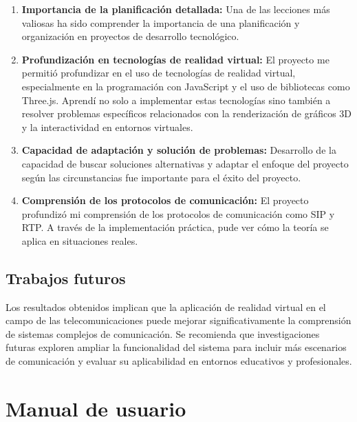 \documentclass[a4paper, 12pt]{book}
\begin{document}
\begin{enumerate}
\item \textbf{Importancia de la planificación detallada:} Una de las lecciones más valiosas ha sido comprender la importancia de una planificación 
y organización en proyectos de desarrollo tecnológico.

\item \textbf{Profundización en tecnologías de realidad virtual:} El proyecto me permitió profundizar en el uso de tecnologías de realidad virtual, 
especialmente en la programación con JavaScript y el uso de bibliotecas como Three.js. Aprendí no solo a implementar estas tecnologías sino también 
a resolver problemas específicos relacionados con la renderización de gráficos 3D y la interactividad en entornos virtuales.

\item \textbf{Capacidad de adaptación y solución de problemas:} Desarrollo de la capacidad de buscar soluciones alternativas y adaptar el enfoque del proyecto según las 
circunstancias fue importante para el éxito del proyecto.

\item \textbf{Comprensión de los protocolos de comunicación:} El proyecto profundizó mi comprensión de los protocolos de comunicación como SIP y RTP. 
A través de la implementación práctica, pude ver cómo la teoría se aplica en situaciones reales.
\end{enumerate}


\section{Trabajos futuros}
\label{sec:trabajos_futuros}

Los resultados obtenidos implican que la aplicación de realidad virtual en el campo de las telecomunicaciones puede mejorar 
significativamente la comprensión de sistemas complejos de comunicación. Se recomienda que investigaciones futuras exploren 
ampliar la funcionalidad del sistema para incluir más escenarios de comunicación y evaluar su 
aplicabilidad en entornos educativos y profesionales.



\cleardoublepage
\appendix
\chapter{Manual de usuario}
\label{app:manual}
\end{document}
